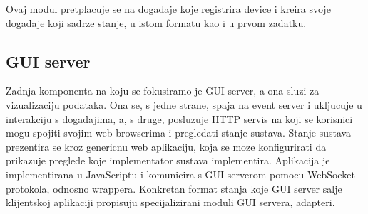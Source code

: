 \documentclass[letterpaper,10pt,croatian]{sphinxmanual}
\begin{document}
\begin{sphinxVerbatim}[commandchars=\\\{\}]
 

       
          
          

     
         

       
         
\end{sphinxVerbatim}

\sphinxAtStartPar
Ovaj modul pretplacuje se na dogadaje koje registrira device i kreira svoje
dogadaje koji sadrze stanje, u istom formatu kao i u prvom zadatku.


\subsection{GUI server}
\label{\detokenize{hat/components:gui-server}}
\noindent{}

\sphinxAtStartPar
Zadnja komponenta na koju se fokusiramo je GUI server, a ona sluzi za
vizualizaciju podataka. Ona se, s jedne strane, spaja na event server i
ukljucuje u interakciju s dogadajima, a, s druge, posluzuje HTTP servis na koji
se korisnici mogu spojiti svojim web browserima i pregledati stanje sustava.
Stanje sustava prezentira se kroz genericnu web aplikaciju, koja se moze
konfigurirati da prikazuje preglede koje implementator sustava implementira.
Aplikacija je implementirana u JavaScriptu i komunicira s GUI serverom pomocu
WebSocket protokola, odnosno 
wrappera. Konkretan format stanja koje GUI server salje klijentskoj aplikaciji
propisuju specijalizirani moduli GUI servera, adapteri.
\end{document}
